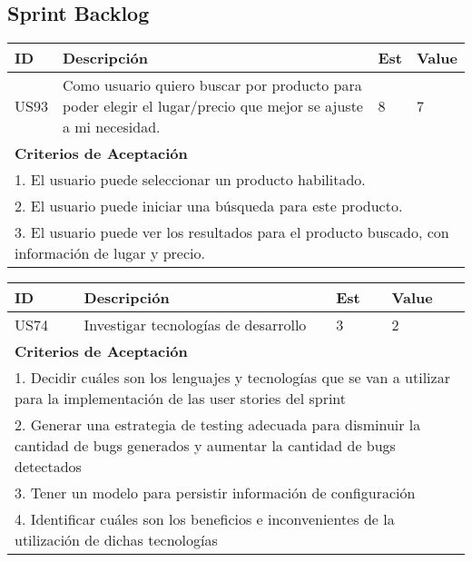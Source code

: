 \documentclass[a4paper,8pt]{article}
\begin{document}
\subsection{Sprint Backlog}

\bigskip
\center
\begin{tabular}{|p{1cm}|p{10cm}|p{1cm}|p{1cm}|}
\hline
\hline
\textbf{ID}&\textbf{Descripción}&\textbf{Est}&\textbf{Value}\\
\hline
\hline
US93&Como usuario quiero buscar por producto para poder elegir el lugar/precio que mejor se ajuste a mi necesidad.& 8& 7\\
\hline
\hline
\multicolumn{4}{|p{13cm}|}{ \textbf{Criterios de Aceptación}} \\
\hline
\hline
\multicolumn{4}{|p{13cm}|}{1. El usuario puede seleccionar un producto habilitado.}\\
\multicolumn{4}{|p{13cm}|}{2. El usuario puede iniciar una búsqueda para este producto.}\\
\multicolumn{4}{|p{13cm}|}{3. El usuario puede ver los resultados para el producto buscado, con información de lugar y precio.}\\
\hline
\hline
\end{tabular}

\bigskip
\begin{tabular}{|p{1cm}|p{10cm}|p{1cm}|p{1cm}|}
\hline
\hline
\textbf{ID}&\textbf{Descripción}&\textbf{Est}&\textbf{Value}\\
\hline
\hline
US74&Investigar tecnologías de desarrollo&3&2\\
\hline
\hline
\multicolumn{4}{|p{13cm}|}{ \textbf{Criterios de Aceptación}} \\
\hline
\hline
\multicolumn{4}{|p{13cm}|}{1. Decidir cuáles son los lenguajes y tecnologías que se van a utilizar para la implementación de las user stories del sprint}\\
\multicolumn{4}{|p{13cm}|}{2. Generar una estrategia de testing adecuada para disminuir la cantidad de bugs generados y aumentar la cantidad de bugs detectados}\\
\multicolumn{4}{|p{13cm}|}{3. Tener un modelo para persistir información de configuración}\\
\multicolumn{4}{|p{13cm}|}{4. Identificar cuáles son los beneficios e inconvenientes de la utilización de dichas tecnologías}\\
\hline
\hline
\end{tabular}
\end{document}
